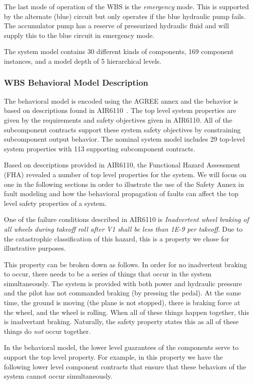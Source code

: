 The last mode of operation of the WBS is the \textit{emergency} mode. This is supported by the alternate (blue) circuit but only operates if the blue hydraulic pump fails. The accumulator pump has a reserve of pressurized hydraulic fluid and will supply this to the blue circuit in emergency mode.

The system model contains 30 different kinds of components, 169 component instances, and a model depth of 5 hierarchical levels. 

\subsubsection{WBS Behavioral Model Description}
The behavioral model is encoded using the AGREE annex and the behavior is based on descriptions found in AIR6110~\cite{AIR6110}. The top level system properties are given by the requirements and safety objectives given in AIR6110. All of the subcomponent contracts support these system safety objectives by constraining subcomponent output behavior. The nominal system model includes 29 top-level system properties with 113 supporting subcomponent contracts. 

Based on descriptions provided in AIR6110, the Functional Hazard Assessment (FHA) revealed a number of top level properties for the system. We will focus on one in the following sections in order to illustrate the use of the Safety Annex in fault modeling and how the behavioral propagation of faults can affect the top level safety properties of a system. 

One of the failure conditions described in AIR6110 is \textit{Inadvertent wheel braking of all wheels during takeoff roll after V1 shall be less than 1E-9 per takeoff}. Due to the catastrophic classification of this hazard, this is a property we chose for illustrative purposes. 

This property can be broken down as follows. In order for no inadvertent braking to occur, there needs to be a series of things that occur in the system simultaneously. The system is provided with both power and hydraulic pressure and the pilot has not commanded braking (by pressing the pedal). At the same time, the ground is moving (the plane is not stopped), there is braking force at the wheel, and the wheel is rolling. When all of these things happen together, this is inadvertant braking. Naturally, the safety property states this as all of these things do \textit{not} occur together. 

In the behavioral model, the lower level guarantees of the components serve to support the top level property. For example, in this property we have the following lower level component contracts that ensure that these behaviors of the system cannot occur simultaneously.












